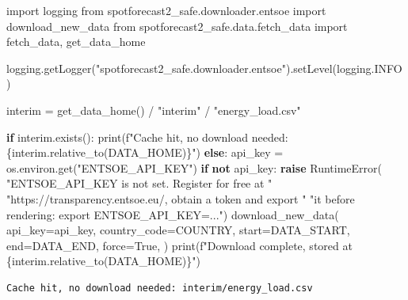 \documentclass[
  english,
  letterpaper,
]{scrbook}
\newenvironment{Shaded}{\begin{snugshade}}{\end{snugshade}}
\newcommand{\BuiltInTok}[1]{\textcolor[rgb]{0.00,0.23,0.31}{#1}}
\newcommand{\ControlFlowTok}[1]{\textcolor[rgb]{0.00,0.23,0.31}{\textbf{#1}}}
\newcommand{\ImportTok}[1]{\textcolor[rgb]{0.00,0.46,0.62}{#1}}
\newcommand{\KeywordTok}[1]{\textcolor[rgb]{0.00,0.23,0.31}{\textbf{#1}}}
\newcommand{\NormalTok}[1]{\textcolor[rgb]{0.00,0.23,0.31}{#1}}
\newcommand{\OperatorTok}[1]{\textcolor[rgb]{0.37,0.37,0.37}{#1}}
\newcommand{\PreprocessorTok}[1]{\textcolor[rgb]{0.68,0.00,0.00}{#1}}
\newcommand{\SpecialCharTok}[1]{\textcolor[rgb]{0.37,0.37,0.37}{#1}}
\newcommand{\SpecialStringTok}[1]{\textcolor[rgb]{0.13,0.47,0.30}{#1}}
\newcommand{\StringTok}[1]{\textcolor[rgb]{0.13,0.47,0.30}{#1}}
\newcommand{\VariableTok}[1]{\textcolor[rgb]{0.07,0.07,0.07}{#1}}
\begin{document}
\protect{}\label{download-entsoe}
\begin{Shaded}
\begin{Highlighting}[]
\ImportTok{import}\NormalTok{ logging}
\ImportTok{from}\NormalTok{ spotforecast2\_safe.downloader.entsoe }\ImportTok{import}\NormalTok{ download\_new\_data}
\ImportTok{from}\NormalTok{ spotforecast2\_safe.data.fetch\_data }\ImportTok{import}\NormalTok{ fetch\_data, get\_data\_home}

\NormalTok{logging.getLogger(}\StringTok{"spotforecast2\_safe.downloader.entsoe"}\NormalTok{).setLevel(logging.INFO)}

\NormalTok{interim }\OperatorTok{=}\NormalTok{ get\_data\_home() }\OperatorTok{/} \StringTok{"interim"} \OperatorTok{/} \StringTok{"energy\_load.csv"}

\ControlFlowTok{if}\NormalTok{ interim.exists():}
    \BuiltInTok{print}\NormalTok{(}\SpecialStringTok{f"Cache hit, no download needed: }\SpecialCharTok{\{}\NormalTok{interim}\SpecialCharTok{.}\NormalTok{relative\_to(DATA\_HOME)}\SpecialCharTok{\}}\SpecialStringTok{"}\NormalTok{)}
\ControlFlowTok{else}\NormalTok{:}
\NormalTok{    api\_key }\OperatorTok{=}\NormalTok{ os.environ.get(}\StringTok{"ENTSOE\_API\_KEY"}\NormalTok{)}
    \ControlFlowTok{if} \KeywordTok{not}\NormalTok{ api\_key:}
        \ControlFlowTok{raise} \PreprocessorTok{RuntimeError}\NormalTok{(}
            \StringTok{"ENTSOE\_API\_KEY is not set. Register for free at "}
            \StringTok{"https://transparency.entsoe.eu/, obtain a token and export "}
            \StringTok{"it before rendering: export ENTSOE\_API\_KEY=..."}\NormalTok{)}
\NormalTok{    download\_new\_data(}
\NormalTok{        api\_key}\OperatorTok{=}\NormalTok{api\_key,}
\NormalTok{        country\_code}\OperatorTok{=}\NormalTok{COUNTRY,}
\NormalTok{        start}\OperatorTok{=}\NormalTok{DATA\_START,}
\NormalTok{        end}\OperatorTok{=}\NormalTok{DATA\_END,}
\NormalTok{        force}\OperatorTok{=}\VariableTok{True}\NormalTok{,}
\NormalTok{    )}
    \BuiltInTok{print}\NormalTok{(}\SpecialStringTok{f"Download complete, stored at }\SpecialCharTok{\{}\NormalTok{interim}\SpecialCharTok{.}\NormalTok{relative\_to(DATA\_HOME)}\SpecialCharTok{\}}\SpecialStringTok{"}\NormalTok{)}
\end{Highlighting}
\end{Shaded}

\begin{verbatim}
Cache hit, no download needed: interim/energy_load.csv
\end{verbatim}
\end{document}

